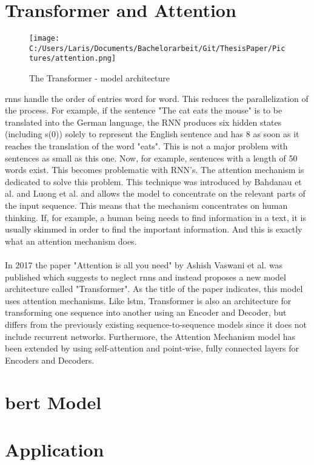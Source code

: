 \documentclass[a4paper, 11pt,titlepage,oneside,openany]{book}
\begin{document}
\section{Transformer and Attention}
\begin{figure}[h]
	\centering
	\texttt{[image: C:/Users/Laris/Documents/Bachelorarbeit/Git/ThesisPaper/Pictures/attention.png]}
	\caption{The Transformer - model architecture \cite{attention}}
\end{figure}
\noindent \gls{rnn}s handle the order of entries word for word. This reduces the parallelization of the process. For example, if the sentence "The cat eats the mouse" is to be translated into the German language, the RNN produces six hidden states (including s(0)) solely to represent the English sentence and has 8 as soon as it reaches the translation of the word "eats". This is not a major problem with sentences as small as this one. Now, for example, sentences with a length of 50 words exist. This becomes problematic with RNN's. The attention mechanism is dedicated to solve this problem. This technique was introduced by Bahdanau et al. \cite{bahdnau} and Luong et al. \cite{lunong} and allows the model to concentrate on the relevant parts of the input sequence. This means that the mechanism concentrates on human thinking. If, for example, a human being needs to find information in a text, it is usually skimmed in order to find the important information. And this is exactly what an attention mechanism does. \\
\\In 2017 the paper "Attention is all you need" by Ashish Vaswani et al.  \cite{attention} was published which suggests to neglect \gls{rnn}s and instead proposes a new model architecture called "Transformer". As the title of the paper indicates, this model uses attention mechanisms. Like \gls{lstm}, Transformer is also an architecture for transforming one sequence into another using an Encoder and Decoder, but differs from the previously existing sequence-to-sequence models since it does not include recurrent networks. Furthermore, the Attention Mechanism model has been extended by using self-attention and point-wise, fully connected layers for Encoders and Decoders.
\section{\gls{bert} Model}
\section{Application}
\end{document}

